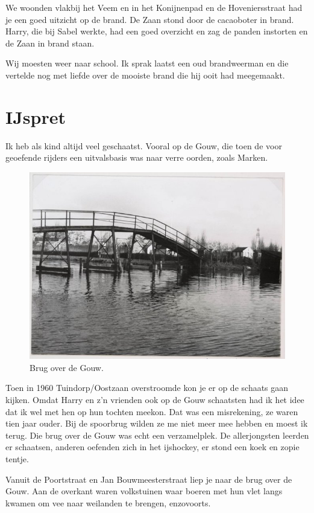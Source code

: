 \documentclass[10pt,twoside, openright]{memoir}
\begin{document}
We woonden vlakbij het Veem en in het Konijnenpad en de Hoveniersstraat had je een goed uitzicht op de brand. De Zaan stond door de cacaoboter in brand. Harry, die bij Sabel werkte, had een goed overzicht en zag de panden instorten en de Zaan in brand staan.

Wij moesten weer naar school. Ik sprak laatst een oud brandweerman en die vertelde nog met liefde over de mooiste brand die hij ooit had meegemaakt. 

\chapter{IJspret} %
\label{cha:ijspret}

Ik heb als kind altijd veel geschaatst. Vooral op de Gouw, die toen de voor geoefende rijders een uitvalsbasis was naar verre oorden, zoals Marken.

\begin{figure}
\includegraphics[width=\textwidth]{img/84bruggouw}
\caption*{\footnotesize Brug over de Gouw.}
\end{figure}

Toen in 1960 Tuindorp/Oostzaan overstroomde kon je er op de schaats gaan kijken. Omdat Harry en z’n vrienden ook op de Gouw schaatsten had ik het idee dat ik wel met hen op hun tochten meekon. Dat was een misrekening, ze waren tien jaar ouder. Bij de spoorbrug wilden ze me niet meer mee hebben en moest ik terug. Die brug over de Gouw was echt een verzamelplek. De allerjongsten leerden er schaatsen, anderen oefenden zich in het ijshockey, er stond een koek en zopie tentje.

Vanuit de Poortstraat en Jan Bouwmeesterstraat liep je naar de brug over de Gouw. Aan de overkant waren volkstuinen waar boeren met hun vlet langs kwamen om vee naar weilanden te brengen, enzovoorts. 
\end{document}
